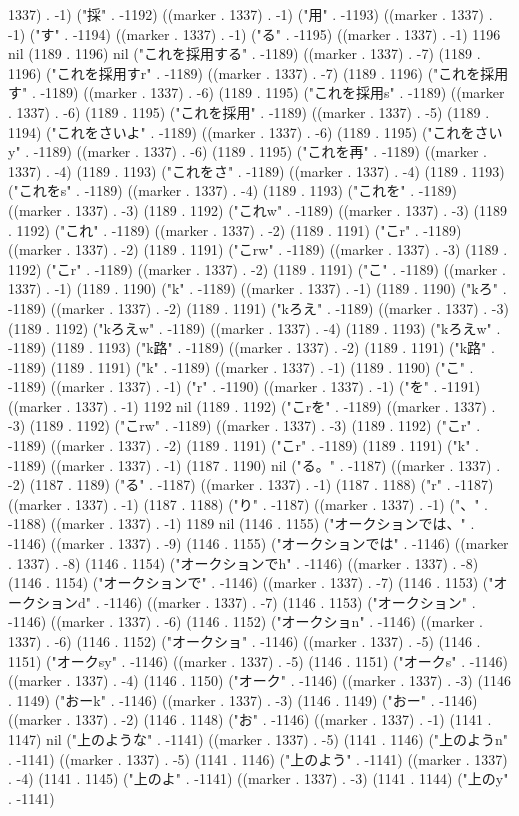 1337) . -1) ("採" . -1192) ((marker . 1337) . -1) ("用" . -1193) ((marker . 1337) . -1) ("す" . -1194) ((marker . 1337) . -1) ("る" . -1195) ((marker . 1337) . -1) 1196 nil (1189 . 1196) nil ("これを採用する" . -1189) ((marker . 1337) . -7) (1189 . 1196) ("これを採用すr" . -1189) ((marker . 1337) . -7) (1189 . 1196) ("これを採用す" . -1189) ((marker . 1337) . -6) (1189 . 1195) ("これを採用s" . -1189) ((marker . 1337) . -6) (1189 . 1195) ("これを採用" . -1189) ((marker . 1337) . -5) (1189 . 1194) ("これをさいよ" . -1189) ((marker . 1337) . -6) (1189 . 1195) ("これをさいy" . -1189) ((marker . 1337) . -6) (1189 . 1195) ("これを再" . -1189) ((marker . 1337) . -4) (1189 . 1193) ("これをさ" . -1189) ((marker . 1337) . -4) (1189 . 1193) ("これをs" . -1189) ((marker . 1337) . -4) (1189 . 1193) ("これを" . -1189) ((marker . 1337) . -3) (1189 . 1192) ("これw" . -1189) ((marker . 1337) . -3) (1189 . 1192) ("これ" . -1189) ((marker . 1337) . -2) (1189 . 1191) ("こr" . -1189) ((marker . 1337) . -2) (1189 . 1191) ("こrw" . -1189) ((marker . 1337) . -3) (1189 . 1192) ("こr" . -1189) ((marker . 1337) . -2) (1189 . 1191) ("こ" . -1189) ((marker . 1337) . -1) (1189 . 1190) ("k" . -1189) ((marker . 1337) . -1) (1189 . 1190) ("kろ" . -1189) ((marker . 1337) . -2) (1189 . 1191) ("kろえ" . -1189) ((marker . 1337) . -3) (1189 . 1192) ("kろえw" . -1189) ((marker . 1337) . -4) (1189 . 1193) ("kろえw" . -1189) (1189 . 1193) ("k路" . -1189) ((marker . 1337) . -2) (1189 . 1191) ("k路" . -1189) (1189 . 1191) ("k" . -1189) ((marker . 1337) . -1) (1189 . 1190) ("こ" . -1189) ((marker . 1337) . -1) ("r" . -1190) ((marker . 1337) . -1) ("を" . -1191) ((marker . 1337) . -1) 1192 nil (1189 . 1192) ("こrを" . -1189) ((marker . 1337) . -3) (1189 . 1192) ("こrw" . -1189) ((marker . 1337) . -3) (1189 . 1192) ("こr" . -1189) ((marker . 1337) . -2) (1189 . 1191) ("こr" . -1189) (1189 . 1191) ("k" . -1189) ((marker . 1337) . -1) (1187 . 1190) nil ("る。" . -1187) ((marker . 1337) . -2) (1187 . 1189) ("る" . -1187) ((marker . 1337) . -1) (1187 . 1188) ("r" . -1187) ((marker . 1337) . -1) (1187 . 1188) ("り" . -1187) ((marker . 1337) . -1) ("、" . -1188) ((marker . 1337) . -1) 1189 nil (1146 . 1155) ("オークションでは、" . -1146) ((marker . 1337) . -9) (1146 . 1155) ("オークションでは" . -1146) ((marker . 1337) . -8) (1146 . 1154) ("オークションでh" . -1146) ((marker . 1337) . -8) (1146 . 1154) ("オークションで" . -1146) ((marker . 1337) . -7) (1146 . 1153) ("オークションd" . -1146) ((marker . 1337) . -7) (1146 . 1153) ("オークション" . -1146) ((marker . 1337) . -6) (1146 . 1152) ("オークショn" . -1146) ((marker . 1337) . -6) (1146 . 1152) ("オークショ" . -1146) ((marker . 1337) . -5) (1146 . 1151) ("オークsy" . -1146) ((marker . 1337) . -5) (1146 . 1151) ("オークs" . -1146) ((marker . 1337) . -4) (1146 . 1150) ("オーク" . -1146) ((marker . 1337) . -3) (1146 . 1149) ("おーk" . -1146) ((marker . 1337) . -3) (1146 . 1149) ("おー" . -1146) ((marker . 1337) . -2) (1146 . 1148) ("お" . -1146) ((marker . 1337) . -1) (1141 . 1147) nil ("上のような" . -1141) ((marker . 1337) . -5) (1141 . 1146) ("上のようn" . -1141) ((marker . 1337) . -5) (1141 . 1146) ("上のよう" . -1141) ((marker . 1337) . -4) (1141 . 1145) ("上のよ" . -1141) ((marker . 1337) . -3) (1141 . 1144) ("上のy" . -1141) 